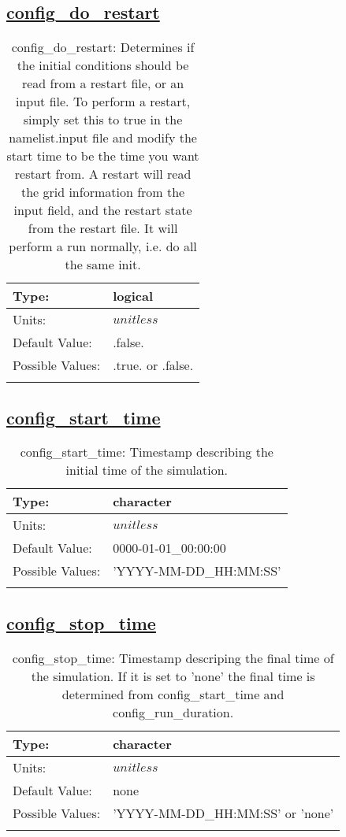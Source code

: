\subsection[config\_do\_restart]{\hyperref[sec:nm_tab_time_management]{config\_do\_restart}}
\label{subsec:nm_sec_config_do_restart}
\begin{center}
\begin{longtable}{| p{2.0in} | p{4.0in} |}
    \hline
    Type: & logical \\
    \hline
    Units: & $unitless$ \\
    \hline
    Default Value: & .false. \\
    \hline
    Possible Values: & .true. or .false. \\
    \hline
    \caption{config\_do\_restart: Determines if the initial conditions should be read from a restart file, or an input file.  To perform a restart, simply set this to true in the namelist.input file and modify the start time to be the time you want restart from.  A restart will read the grid information from the input field, and the restart state from the restart file.  It will perform a run normally, i.e. do all the same init.}
\end{longtable}
\end{center}
\subsection[config\_start\_time]{\hyperref[sec:nm_tab_time_management]{config\_start\_time}}
\label{subsec:nm_sec_config_start_time}
\begin{center}
\begin{longtable}{| p{2.0in} | p{4.0in} |}
    \hline
    Type: & character \\
    \hline
    Units: & $unitless$ \\
    \hline
    Default Value: & 0000-01-01\_00:00:00 \\
    \hline
    Possible Values: & 'YYYY-MM-DD\_HH:MM:SS' \\
    \hline
    \caption{config\_start\_time: Timestamp describing the initial time of the simulation.}
\end{longtable}
\end{center}
\subsection[config\_stop\_time]{\hyperref[sec:nm_tab_time_management]{config\_stop\_time}}
\label{subsec:nm_sec_config_stop_time}
\begin{center}
\begin{longtable}{| p{2.0in} | p{4.0in} |}
    \hline
    Type: & character \\
    \hline
    Units: & $unitless$ \\
    \hline
    Default Value: & none \\
    \hline
    Possible Values: & 'YYYY-MM-DD\_HH:MM:SS' or 'none' \\
    \hline
    \caption{config\_stop\_time: Timestamp descriping the final time of the simulation. If it is set to 'none' the final time is determined from config\_start\_time and config\_run\_duration.}
\end{longtable}
\end{center}
